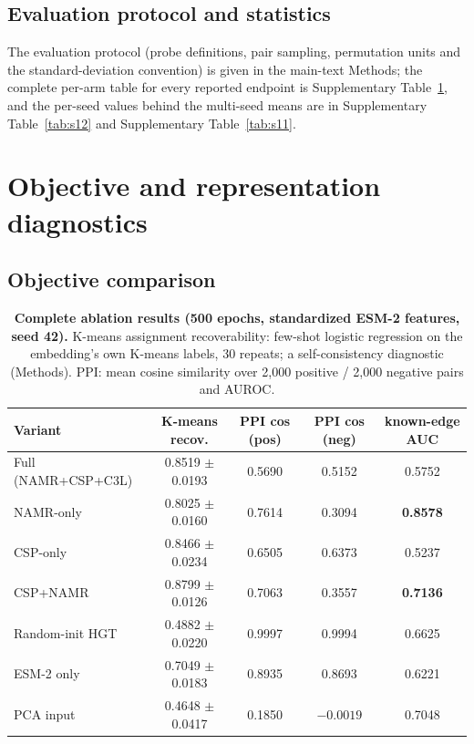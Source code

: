 \documentclass[11pt,a4paper]{article}
\newcommand{\supptab}[1]{Supplementary Table~\ref{#1}}
\begin{document}
\subsection{Evaluation protocol and statistics}

The evaluation protocol (probe definitions, pair sampling, permutation units and the standard-deviation convention) is given in the main-text Methods; the complete per-arm table for every reported endpoint is \supptab{tab:s1}, and the per-seed values behind the multi-seed means are in \supptab{tab:s12} and \supptab{tab:s11}.
\FloatBarrier


\section{Objective and representation diagnostics}

\subsection{Objective comparison}

\begin{table}[H]
\centering
\caption{\textbf{Complete ablation results (500 epochs, standardized ESM-2 features, seed 42).} K-means assignment recoverability: few-shot logistic regression on the embedding's own K-means labels, 30 repeats; a self-consistency diagnostic (Methods). PPI: mean cosine similarity over 2,000 positive / 2,000 negative pairs and AUROC.}
\label{tab:s1}
\footnotesize
\begin{tabular}{@{}lcccc@{}}
\toprule
\textbf{Variant} & \textbf{K-means recov.} & \textbf{PPI cos (pos)} & \textbf{PPI cos (neg)} & \textbf{known-edge AUC} \\
\midrule
Full (NAMR+CSP+C3L) & 0.8519 $\pm$ 0.0193 & 0.5690 & 0.5152 & 0.5752 \\
NAMR-only & 0.8025 $\pm$ 0.0160 & 0.7614 & 0.3094 & \textbf{0.8578} \\
CSP-only & 0.8466 $\pm$ 0.0234 & 0.6505 & 0.6373 & 0.5237 \\
CSP+NAMR & 0.8799 $\pm$ 0.0126 & 0.7063 & 0.3557 & \textbf{0.7136} \\
Random-init HGT & 0.4882 $\pm$ 0.0220 & 0.9997 & 0.9994 & 0.6625 \\
ESM-2 only & 0.7049 $\pm$ 0.0183 & 0.8935 & 0.8693 & 0.6221 \\
PCA input & 0.4648 $\pm$ 0.0417 & 0.1850 & $-0.0019$ & 0.7048 \\
\bottomrule
\end{tabular}
\end{table}
\end{document}
